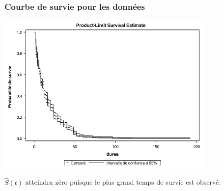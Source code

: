 \documentclass{beamer}
\begin{document}
\begin{frame}
\frametitle{Courbe de survie pour les données }

\begin{center}
\includegraphics[width = 0.8\textwidth]{img/c7/diapos7e08}
\end{center}
{\footnotesize $\widehat{S}(t)$ atteindra zéro puisque le plus grand temps de survie est observé.

}
\end{frame}
% 
% 
%     
% 
% 
% 
% 
\end{document}
